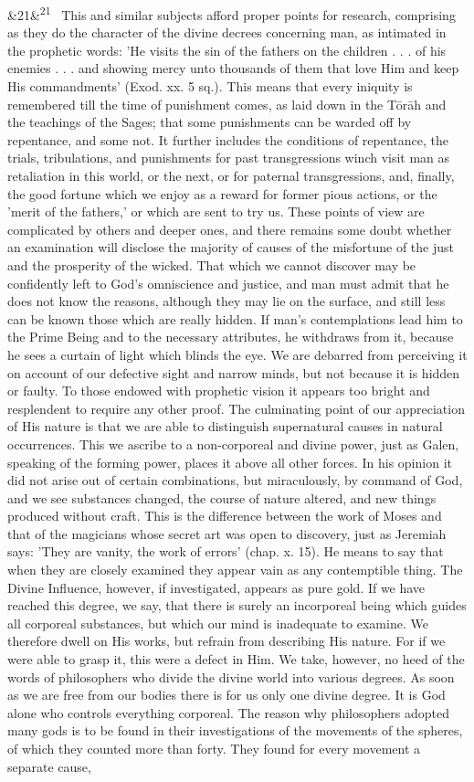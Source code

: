 \documentclass[12pt]{article}
\newcommand{\para}[1][]{\par\noindent\ifx&#1&\else\textsuperscript{\footnotesize #1}~\fi}
\begin{document}
\para[21] This and similar subjects afford proper points for research, comprising as they do the character of the divine decrees concerning man, as intimated in the prophetic words: 'He visits the sin of the fathers on the children . . . of his enemies . . . and showing mercy unto thousands of them that love Him and keep His commandments' (Exod. xx. 5 sq.). This means that every iniquity is remembered till the time of punishment comes, as laid down in the Tōrāh and the teachings of the Sages; that some punishments can be warded off by repentance, and some not. It further includes the conditions of repentance, the trials, tribulations, and punishments for past transgressions winch visit man as retaliation in this world, or the next, or for paternal transgressions, and, finally, the good fortune which we enjoy as a reward for former pious actions, or the 'merit of the fathers,' or which are sent to try us. These points of view are complicated by others and deeper ones, and there remains some doubt whether an examination will disclose the majority of causes of the misfortune of the just and the prosperity of the wicked. That which we cannot discover may be confidently left to God's omniscience and justice, and man must admit that he does not know the reasons, although they may lie on the surface, and still less can be known those which are really hidden. If man's contemplations lead him to the Prime Being and to the necessary attributes, he withdraws from it, because he sees a curtain of light which blinds the eye. We are debarred from perceiving it on account of our defective sight and narrow minds, but not because it is hidden or faulty. To those endowed with prophetic vision it appears too bright and resplendent to require any other proof. The culminating point of our appreciation of His nature is that we are able to distinguish supernatural causes in natural occurrences. This we ascribe to a non-corporeal and divine power, just as Galen, speaking of the forming power, places it above all other forces. In his opinion it did not arise out of certain combinations, but miraculously, by command of God, and we see substances changed, the course of nature altered, and new things produced without craft. This is the difference between the work of Moses and that of the magicians whose secret art was open to discovery, just as Jeremiah says: 'They are vanity, the work of errors' (chap. x. 15). He means to say that when they are closely examined they appear vain as any contemptible thing. The Divine Influence, however, if investigated, appears as pure gold. If we have reached this degree, we say, that there is surely an incorporeal being which guides all corporeal substances, but which our mind is inadequate to examine. We therefore dwell on His works, but refrain from describing His nature. For if we were able to grasp it, this were a defect in Him. We take, however, no heed of the words of philosophers who divide the divine world into various degrees. As soon as we are free from our bodies there is for us only one divine degree. It is God alone who controls everything corporeal. The reason why philosophers adopted many gods is to be found in their investigations of the movements of the spheres, of which they counted more than forty. They found for every movement a separate cause, 
\end{document}
